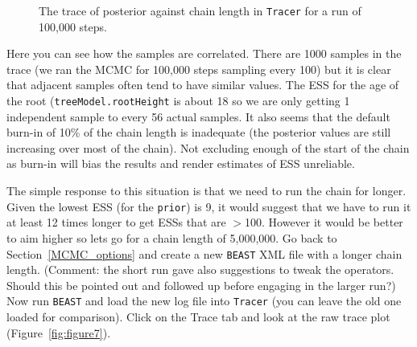 \documentclass[cup7b, english]{cupbook}
\begin{document}
\begin{figure}[htbp]
\begin{center}
\leavevmode
{}
\end{center}
\caption{The trace of posterior against chain length in \texttt{Tracer} for a run of 100,000 steps.}
\label{fig:figure6}
\end{figure}

Here you can see how the samples are correlated. There are 1000 samples in the trace
(we ran the MCMC for 100,000 steps sampling every 100) but it is clear that adjacent
samples often tend to have similar values. The ESS for the age of the root (\texttt{treeModel.rootHeight}
is about 18 so we are only getting 1 independent sample to every 56 actual samples. It also seems
that the default burn-in of 10\% of the chain length is inadequate (the posterior values
are still increasing over most of the chain). Not excluding enough
of the start of the chain as burn-in will bias the results and render estimates of ESS
unreliable.

The simple response to this situation is that we need to run the chain for longer. Given the lowest
ESS (for the \texttt{prior}) is 9, it would suggest that we have to run it at least 12
times longer to get ESSs that are $>$100. However it would be better to aim higher so lets
go for a chain length of 5,000,000. Go back to Section~\ref{MCMC_options}
and create a new \texttt{BEAST} XML file with a longer chain length. (Comment: the short run gave also suggestions to tweak the operators. Should this be pointed out and followed up before engaging in the larger run?) Now run \texttt{BEAST} and load the new
log file into \texttt{Tracer} (you can leave the old one loaded for comparison). Click on the Trace
tab and look at the raw trace plot (Figure~\ref{fig:figure7}).
\end{document}
